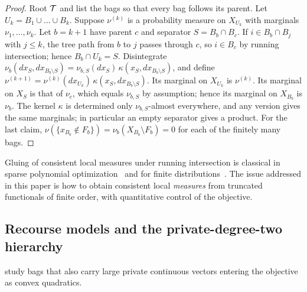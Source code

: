 \begin{proof}
Root $\mathcal{T}$ and list the bags so that every bag follows its parent. Let
$U_k=B_1\cup\dots\cup B_k$. Suppose $\nu^{(k)}$ is a probability measure on
$X_{U_k}$ with marginals $\nu_1,\dots,\nu_k$. Let $b=k+1$ have parent $c$
and separator $S=B_b\cap B_c$. If $i\in B_b\cap B_j$ with $j\le k$, the tree
path from $b$ to $j$ passes through $c$, so $i\in B_c$ by running
intersection; hence $B_b\cap U_k=S$. Disintegrate
$\nu_b(dx_S,dx_{B_b\setminus S})=\nu_{b,S}(dx_S)\,\kappa(x_S,dx_{B_b\setminus S})$,
and define $\nu^{(k+1)}=\nu^{(k)}(dx_{U_k})\,\kappa(x_S,dx_{B_b\setminus S})$.
Its marginal on $X_{U_k}$ is $\nu^{(k)}$. Its marginal on $X_S$ is that of
$\nu_c$, which equals $\nu_{b,S}$ by assumption; hence its marginal on
$X_{B_b}$ is $\nu_b$. The kernel $\kappa$ is determined only
$\nu_{b,S}$-almost everywhere, and any version gives the same marginals; in
particular an empty separator gives a product. For the last claim,
$\nu(\{x_{B_b}\notin F_b\})=\nu_b(X_{B_b}\setminus F_b)=0$ for each of the
finitely many bags.
\end{proof}

Gluing of consistent local measures under running intersection is
classical in sparse polynomial optimization~\cite{lasserre2006-convergent-sdprelaxations-in-polynomial-optimization}
and for finite distributions~\cite{vorobev1962-consistent-families}. The
issue addressed in this paper is how to obtain consistent local
\emph{measures} from truncated functionals of finite order, with
quantitative control of the objective.

\subsection{Recourse models and the private-degree-two hierarchy}
\label{sec:set-recourse}

 study bags that also carry large private
continuous vectors entering the objective as convex quadratics.

